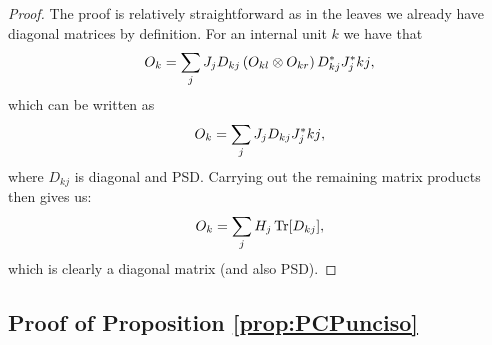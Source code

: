 \begin{proof}
	The proof is relatively straightforward as in the leaves we already have diagonal matrices by definition. For an internal unit $k$ we have that
	\begin{align}
		O_k = \sum_j J_j D_{kj} \left(O_{kl}\otimes O_{kr} \right)  D_{kj}^* J_j^*{kj},
	\end{align}
	which can be written as
	\begin{align}
		O_k = \sum_j J_j D_{kj} J_j^*{kj},
	\end{align}
	where $D_{kj}$ is diagonal and PSD. Carrying out the remaining matrix products then gives us:
	\begin{align}
		O_k = \sum_j H_j \Tr [D_{kj}],
	\end{align}
	which is clearly a diagonal matrix (and also PSD).
\end{proof}



\subsection{Proof of Proposition \ref{prop:PCPunciso}}
\label{sec:proof:prop:PCPunciso}


\propPCPunciso*

